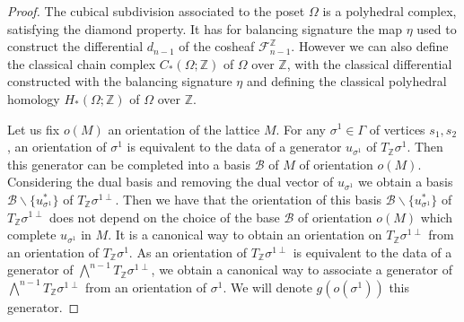 \documentclass{article}
\begin{document}
\begin{proof}
    The cubical subdivision associated to the poset $\Omega$ is a polyhedral complex, satisfying the diamond property. It has for balancing signature the map $\eta$ used to construct the differential $d_{n-1}$ of the cosheaf $\mathcal{F}_{n-1}^{\mathbb{Z}}$. However we can also define the classical chain complex $C_*(\Omega;\mathbb{Z})$ of $\Omega$ over $\mathbb{Z}$, with the classical differential constructed with the balancing signature $\eta$ and defining the classical polyhedral homology $H_*(\Omega;\mathbb{Z})$ of $\Omega$ over $\mathbb{Z}$.
    
    Let us fix $o(M)$ an orientation of the lattice $M$. For any $\sigma^1 \in \Gamma$ of vertices $s_1,s_2$, an orientation of $\sigma^1$ is equivalent to the data of a generator $u_{\sigma^1}$ of $T_{\mathbb{Z}}\sigma^1$. Then this generator can be completed into a basis $\mathcal{B}$ of $M$ of orientation $o(M)$. Considering the dual basis and removing the dual vector of $u_{\sigma^1}$ we obtain a basis $\mathcal{B} \backslash \{u_{\sigma^1}^* \}$ of $T_{\mathbb{Z}}\sigma^{1\perp}$. Then we have that the orientation of this basis $\mathcal{B} \backslash \{u_{\sigma^1}^* \}$ of $T_{\mathbb{Z}}\sigma^{1\perp}$ does not depend on the choice of the base $\mathcal{B}$ of orientation $o(M)$ which complete $u_{\sigma^1}$ in $M$. It is a canonical way to obtain an orientation on $T_{\mathbb{Z}}\sigma^{1\perp}$ from an orientation of $T_{\mathbb{Z}}\sigma^1$. As an orientation of $T_{\mathbb{Z}}\sigma^{1\perp}$ is equivalent to the data of a generator of $\bigwedge^{n-1}T_{\mathbb{Z}}\sigma^{1\perp}$, we obtain a canonical way to associate a generator of $\bigwedge^{n-1}T_{\mathbb{Z}}\sigma^{1\perp}$ from an orientation of $\sigma^1$. We will denote $g(o(\sigma^1))$ this generator.


\end{proof}
\end{document}
